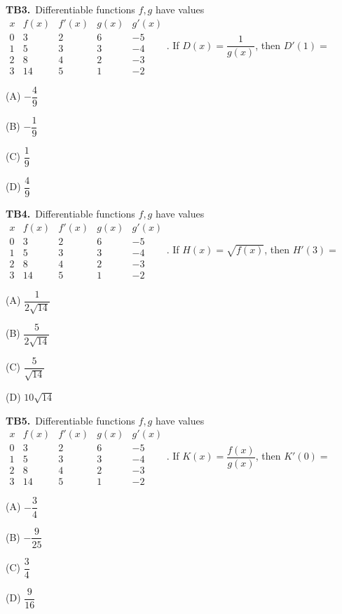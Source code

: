 \documentclass[11pt]{article}
\begin{document}
\bigskip\noindent\textbf{TB3.}\ Differentiable functions $f,g$ have values $\begin{array}{c|rrrr}x&f(x)&f\prime(x)&g(x)&g\prime(x)\\0&3&2&6&-5\\1&5&3&3&-4\\2&8&4&2&-3\\3&14&5&1&-2\end{array}$. If $D(x) = \dfrac{1}{g(x)}$, then $D'(1) =$
\begin{list}{}{\setlength{\leftmargin}{3em}\setlength{\labelwidth}{2.5em}\setlength{\itemsep}{0pt}\setlength{\topsep}{2pt}}
\item[(A)] $-\dfrac{4}{9}$
\item[(B)] $-\dfrac{1}{9}$
\item[(C)] $\dfrac{1}{9}$
\item[(D)] $\dfrac{4}{9}$
\end{list}

\bigskip\noindent\textbf{TB4.}\ Differentiable functions $f,g$ have values $\begin{array}{c|rrrr}x&f(x)&f\prime(x)&g(x)&g\prime(x)\\0&3&2&6&-5\\1&5&3&3&-4\\2&8&4&2&-3\\3&14&5&1&-2\end{array}$. If $H(x) = \sqrt{f(x)}$, then $H'(3) =$
\begin{list}{}{\setlength{\leftmargin}{3em}\setlength{\labelwidth}{2.5em}\setlength{\itemsep}{0pt}\setlength{\topsep}{2pt}}
\item[(A)] $\dfrac{1}{2\sqrt{14}}$
\item[(B)] $\dfrac{5}{2\sqrt{14}}$
\item[(C)] $\dfrac{5}{\sqrt{14}}$
\item[(D)] $10\sqrt{14}$
\end{list}

\bigskip\noindent\textbf{TB5.}\ Differentiable functions $f,g$ have values $\begin{array}{c|rrrr}x&f(x)&f\prime(x)&g(x)&g\prime(x)\\0&3&2&6&-5\\1&5&3&3&-4\\2&8&4&2&-3\\3&14&5&1&-2\end{array}$. If $K(x) = \dfrac{f(x)}{g(x)}$, then $K'(0) =$
\begin{list}{}{\setlength{\leftmargin}{3em}\setlength{\labelwidth}{2.5em}\setlength{\itemsep}{0pt}\setlength{\topsep}{2pt}}
\item[(A)] $-\dfrac{3}{4}$
\item[(B)] $-\dfrac{9}{25}$
\item[(C)] $\dfrac{3}{4}$
\item[(D)] $\dfrac{9}{16}$
\end{list}
\end{document}
